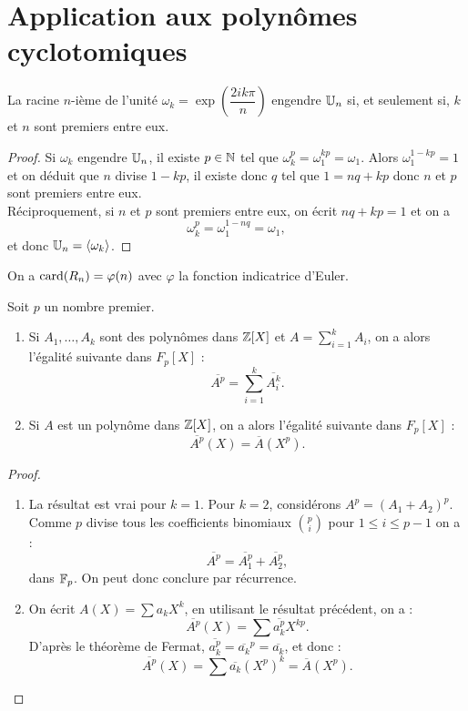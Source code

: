 \section{Application aux polynômes cyclotomiques}

\begin{lem}
\label{lem:4}
La racine $n$-ième de l'unité $\omega_k = \exp \left ( \dfrac{2ik \pi}{n} \right )$ engendre $\mathbb{U}_n$ si, et seulement si, $k$ et $n$
sont premiers entre eux.
\end{lem}

\begin{proof}
Si $\omega_k$ engendre $\mathbb{U}_n$, il existe $p \in \mathbb{N}$ tel que $\omega_k^p = \omega_1 ^{kp} = \omega_1$.
Alors $\omega_1^{1-kp} = 1$ et on déduit que $n$ divise $1-kp$, il existe donc $q$ tel que $1= nq + kp$ donc $n$ et $p$ sont
premiers entre eux. \\
Réciproquement, si $n$ et $p$ sont premiers entre eux, on écrit $nq + kp = 1$ et on a 
\[ \omega_k^{p} = \omega_1^{1-nq} = \omega_1 , \]
et donc $\mathbb{U}_n = \langle \omega_k\rangle$.
\end{proof}

\begin{coro}
On a $\operatorname{card}(R_n) = \varphi(n)$ avec $\varphi$ la fonction indicatrice d'Euler.
\end{coro}

\begin{lem}
\label{lem:5}
Soit $p$ un nombre premier.
\begin{enumerate}
\item Si $A_1, \dots, A_k$ sont des polynômes dans $\mathbb{Z}[X]$ et $A = \sum_{i=1}^k A_i$, on a alors l'égalité suivante dans $F_p[X]$ :
\[ \overline{A^p} = \sum_{i=1}^k \overline{A_i^k} . \]
\item Si $A$ est un polynôme dans $\mathbb{Z}[X]$, on a alors  l'égalité suivante dans $F_p[X]$ :
\[ \overline{A^p}(X) = \overline{A}(X^p) . \]
\end{enumerate}
\end{lem}

\begin{proof}
\begin{enumerate}
\item La résultat est vrai pour $k=1$. Pour $k=2$, considérons $A^p=(A_1+A_2)^p$.
Comme $p$ divise tous les coefficients binomiaux $\binom{p}{i}$ pour $1 \leq i \leq p-1$ on a :
\[ \overline{A^p} = \overline{A_1^p} + \overline{A_2^p}, \]
dans $\mathbb{F}_p$. On peut donc conclure par récurrence. 
\item On écrit $A(X) = \sum a_k X^k$, en utilisant le résultat précédent, on a :
\[ \overline{A^p}(X) = \sum \overline{a_k^p} X^{kp} . \]
D'après le théorème de Fermat, $\overline{a_k^p} = \overline{a_k}^p = \overline{a_k}$, et donc :
\[ \overline{A^p}(X) = \sum \overline{a_k} (X^{p})^k = \overline{A}(X^p) . \]
\end{enumerate}
\end{proof}

